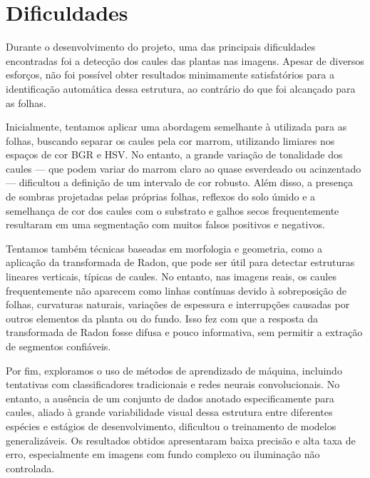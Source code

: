 \section{Dificuldades}

Durante o desenvolvimento do projeto, uma das principais dificuldades encontradas foi a detecção dos caules das plantas nas imagens. Apesar de diversos esforços, não foi possível obter resultados minimamente satisfatórios para a identificação automática dessa estrutura, ao contrário do que foi alcançado para as folhas.

Inicialmente, tentamos aplicar uma abordagem semelhante à utilizada para as folhas, buscando separar os caules pela cor marrom, utilizando limiares nos espaços de cor BGR e HSV. No entanto, a grande variação de tonalidade dos caules — que podem variar do marrom claro ao quase esverdeado ou acinzentado — dificultou a definição de um intervalo de cor robusto. Além disso, a presença de sombras projetadas pelas próprias folhas, reflexos do solo úmido e a semelhança de cor dos caules com o substrato e galhos secos frequentemente resultaram em uma segmentação com muitos falsos positivos e negativos.

Tentamos também técnicas baseadas em morfologia e geometria, como a aplicação da transformada de Radon, que pode ser útil para detectar estruturas lineares verticais, típicas de caules. No entanto, nas imagens reais, os caules frequentemente não aparecem como linhas contínuas devido à sobreposição de folhas, curvaturas naturais, variações de espessura e interrupções causadas por outros elementos da planta ou do fundo. Isso fez com que a resposta da transformada de Radon fosse difusa e pouco informativa, sem permitir a extração de segmentos confiáveis.

Por fim, exploramos o uso de métodos de aprendizado de máquina, incluindo tentativas com classificadores tradicionais e redes neurais convolucionais. No entanto, a ausência de um conjunto de dados anotado especificamente para caules, aliado à grande variabilidade visual dessa estrutura entre diferentes espécies e estágios de desenvolvimento, dificultou o treinamento de modelos generalizáveis. Os resultados obtidos apresentaram baixa precisão e alta taxa de erro, especialmente em imagens com fundo complexo ou iluminação não controlada.

